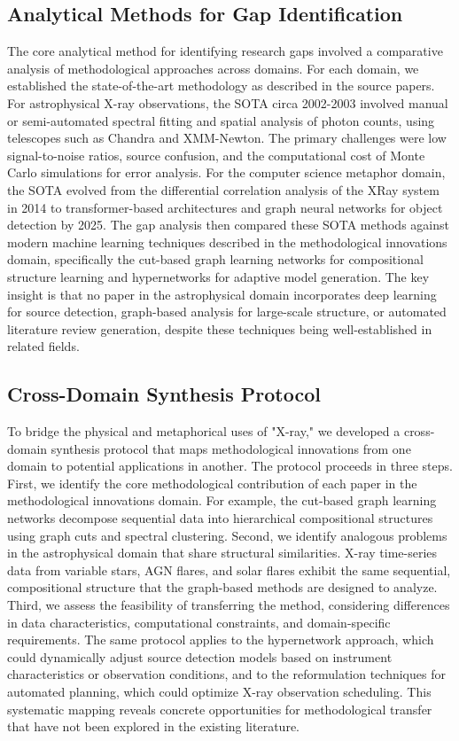 \documentclass[conference]{IEEEtran}
\begin{document}
\subsection{Analytical Methods for Gap Identification}

The core analytical method for identifying research gaps involved a comparative analysis of methodological approaches across domains. For each domain, we established the state-of-the-art methodology as described in the source papers. For astrophysical X-ray observations, the SOTA circa 2002-2003 involved manual or semi-automated spectral fitting and spatial analysis of photon counts, using telescopes such as Chandra and XMM-Newton. The primary challenges were low signal-to-noise ratios, source confusion, and the computational cost of Monte Carlo simulations for error analysis. For the computer science metaphor domain, the SOTA evolved from the differential correlation analysis of the XRay system in 2014 to transformer-based architectures and graph neural networks for object detection by 2025. The gap analysis then compared these SOTA methods against modern machine learning techniques described in the methodological innovations domain, specifically the cut-based graph learning networks for compositional structure learning and hypernetworks for adaptive model generation. The key insight is that no paper in the astrophysical domain incorporates deep learning for source detection, graph-based analysis for large-scale structure, or automated literature review generation, despite these techniques being well-established in related fields.

\subsection{Cross-Domain Synthesis Protocol}

To bridge the physical and metaphorical uses of "X-ray," we developed a cross-domain synthesis protocol that maps methodological innovations from one domain to potential applications in another. The protocol proceeds in three steps. First, we identify the core methodological contribution of each paper in the methodological innovations domain. For example, the cut-based graph learning networks decompose sequential data into hierarchical compositional structures using graph cuts and spectral clustering. Second, we identify analogous problems in the astrophysical domain that share structural similarities. X-ray time-series data from variable stars, AGN flares, and solar flares exhibit the same sequential, compositional structure that the graph-based methods are designed to analyze. Third, we assess the feasibility of transferring the method, considering differences in data characteristics, computational constraints, and domain-specific requirements. The same protocol applies to the hypernetwork approach, which could dynamically adjust source detection models based on instrument characteristics or observation conditions, and to the reformulation techniques for automated planning, which could optimize X-ray observation scheduling. This systematic mapping reveals concrete opportunities for methodological transfer that have not been explored in the existing literature.
\end{document}
